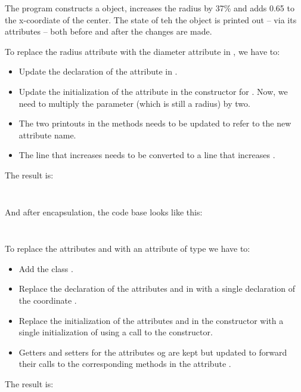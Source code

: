 The program constructs a  object, increases the radius by 37\% and adds 0.65 to the x-coordiate of the center. The state of teh the object is printed out -- via its attributes -- both before and after the changes are made.

To replace the radius attribute  with the diameter attribute  in , we have to:
\begin{itemize}
  \item Update the declaration of the attribute in .
  \item Update the initialization of the attribute in the constructor for . Now, we need to multiply the parameter (which is still a radius) by two.
  \item The two printouts in the  methods needs to be updated to refer to the new attribute name.
  \item The line that increases  needs to be converted to a line that increases .
\end{itemize}

The result is:
\inputminted{csharp}{\context/answer/d/Circle.cs}
\inputminted{csharp}{\context/answer/d/TestCircle.cs}

And after encapsulation, the code base looks like this:
\inputminted{csharp}{\context/answer/e/Circle.cs}
\inputminted{csharp}{\context/answer/e/TestCircle.cs}

To replace the attributes  and  with an attribute  of type  we have to:
\begin{itemize}
  \item Add the class .
  \item Replace the declaration of the attributes  and  in  with a single declaration of the coordinate .
  \item Replace the initialization of the attributes  and  in the  constructor with a single initialization of  using a call to the  constructor.
  \item Getters and setters for the attributes  og  are kept but updated to forward their calls to the corresponding methods in the attribute .
\end{itemize}

The result is:
\inputminted{csharp}{\context/answer/c/Coordinate.cs}
\inputminted{csharp}{\context/answer/c/Circle.cs}
\inputminted{csharp}{\context/answer/c/TestCircle.cs}

